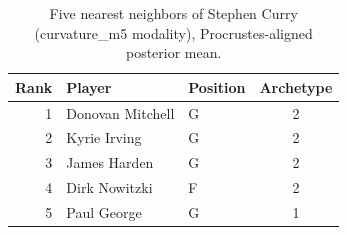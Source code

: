 \begin{table}[htbp]
  \centering\small
  \begin{tabular}{rllc}
    \toprule
    Rank & Player & Position & Archetype \\
    \midrule
    1 & Donovan Mitchell & G & 2 \\
    2 & Kyrie Irving & G & 2 \\
    3 & James Harden & G & 2 \\
    4 & Dirk Nowitzki & F & 2 \\
    5 & Paul George & G & 1 \\
    \bottomrule
  \end{tabular}
  \caption{Five nearest neighbors of Stephen Curry (curvature_m5 modality), Procrustes-aligned posterior mean.}
  \label{tab:Stephen_Curry_neighbors_curvature_m5}
\end{table}

